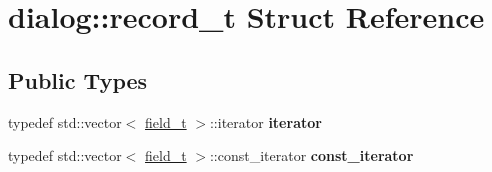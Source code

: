 \hypertarget{structdialog_1_1record__t}{}\section{dialog\+:\+:record\+\_\+t Struct Reference}
\label{structdialog_1_1record__t}
\subsection*{Public Types}
\begin{DoxyCompactItemize}
\item 
\mbox{\label{structdialog_1_1record__t_af4e986b15f9ca35c54a4ab6e8c52d30f}} 
typedef std\+::vector$<$ \hyperlink{structdialog_1_1field__t}{field\+\_\+t} $>$\+::iterator {\bfseries iterator}
\item 
\mbox{\label{structdialog_1_1record__t_a7e34b0f2b52763beee231a58e3263c17}} 
typedef std\+::vector$<$ \hyperlink{structdialog_1_1field__t}{field\+\_\+t} $>$\+::const\+\_\+iterator {\bfseries const\+\_\+iterator}
\end{DoxyCompactItemize}
